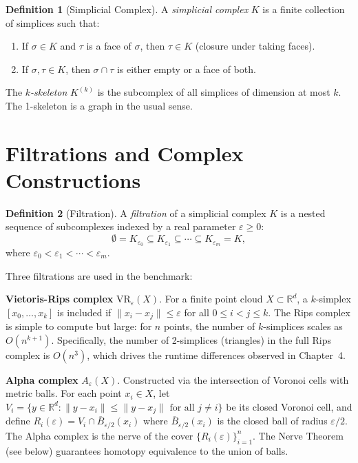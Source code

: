 \documentclass[12pt, a4paper]{report}
\newcommand{\VR}{\mathrm{VR}}
\newcommand{\R}{\mathbb{R}}
\theoremstyle{definition}
\newtheorem{definition}{Definition}[chapter]
\theoremstyle{plain}
\theoremstyle{remark}
\begin{document}
\begin{definition}[Simplicial Complex]
  A \emph{simplicial complex} $K$ is a finite collection of simplices
  such that:
  \begin{enumerate}
    \item If $\sigma \in K$ and $\tau$ is a face of $\sigma$, then
      $\tau \in K$ (closure under taking faces).
    \item If $\sigma, \tau \in K$, then $\sigma \cap \tau$ is either
      empty or a face of both.
  \end{enumerate}
\end{definition}

The \emph{$k$-skeleton} $K^{(k)}$ is the subcomplex of all simplices
of dimension at most $k$. The 1-skeleton is a graph in the usual
sense.

\section{Filtrations and Complex Constructions}
\label{sec:filtrations}

\begin{definition}[Filtration]
  A \emph{filtration} of a simplicial complex $K$ is a nested
  sequence of subcomplexes indexed by a real parameter
  $\varepsilon \ge 0$:
  \begin{equation}
    \emptyset = K_{\varepsilon_0} \subseteq K_{\varepsilon_1}
    \subseteq \cdots \subseteq K_{\varepsilon_m} = K,
    \label{eq:filtration}
  \end{equation}
  where $\varepsilon_0 < \varepsilon_1 < \cdots < \varepsilon_m$.
\end{definition}

Three filtrations are used in the benchmark:

\textbf{Vietoris-Rips complex} $\VR_\varepsilon(X)$. For a finite
point cloud $X \subset \R^d$, a $k$-simplex $[x_0, \dots, x_k]$ is
included if $\|x_i - x_j\| \leq \varepsilon$ for all $0 \leq i < j
\leq k$. The Rips complex is simple to compute but large: for $n$
points, the number of $k$-simplices scales as $O(n^{k+1})$.
Specifically, the number of 2-simplices (triangles) in the full
Rips complex is $O(n^3)$, which drives the runtime differences
observed in Chapter~4.

\textbf{Alpha complex} $A_\varepsilon(X)$. Constructed via the
intersection of Voronoi cells with metric balls. For each point
$x_i \in X$, let $V_i = \{y \in \R^d : \|y - x_i\| \leq
\|y - x_j\| \text{ for all } j \neq i\}$ be its closed Voronoi cell,
and define $R_i(\varepsilon) = V_i \cap \overline{B}_{\varepsilon/2}(x_i)$
where $\overline{B}_{\varepsilon/2}(x_i)$ is the closed ball of radius
$\varepsilon/2$. The Alpha complex is the nerve of the cover
$\{R_i(\varepsilon)\}_{i=1}^n$. The Nerve Theorem (see below)
guarantees homotopy equivalence to the union of balls.
\end{document}
